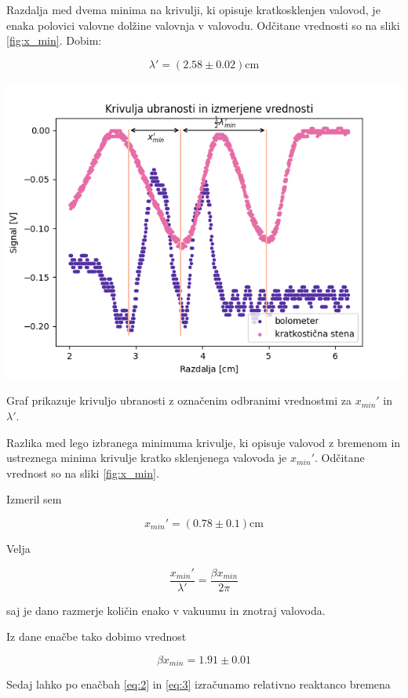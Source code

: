 \documentclass[11pt]{article}
\begin{document}
Razdalja med dvema minima na krivulji, ki opisuje kratkosklenjen valovod,
je enaka polovici valovne dolžine valovnja v valovodu. Odčitane vrednosti so
na sliki \ref{fig:x_min}. Dobim:

\[ \lambda' = (2.58 \pm 0.02) \mathrm{cm}
\]

\begin{slika}[H]
\begin{center}
\includegraphics[width=.9\linewidth]{figures/krivulja_ubranosti_x_min}
\end{center}
\caption{\small Graf prikazuje krivuljo ubranosti z označenim odbranimi vrednostmi
  za \(x_{min}'\) in \( \lambda'\).}\label{fig:x_min}
\end{slika}


Razlika med lego izbranega minimuma krivulje, ki opisuje valovod z bremenom
in ustreznega minima krivulje kratko sklenjenega valovoda je \(x_{min}'\).
Odčitane vrednost so na sliki \ref{fig:x_min}.

Izmeril sem

\[ x_{min}' = (0.78 \pm 0.1) \mathrm{cm}
\]

Velja

\begin{equation}
\label{eq:5}
\frac{x_{min}' }{\lambda'} = \frac{\beta x_{min}}{2 \pi}
\end{equation}

saj je dano razmerje količin enako v vakuumu in znotraj valovoda.

Iz dane enačbe tako dobimo vrednost

\[ \beta x_{min} = 1.91 \pm 0.01
\]


Sedaj lahko po enačbah \ref{eq:2} in \ref{eq:3} izračunamo relativno reaktanco
bremena
\end{document}
